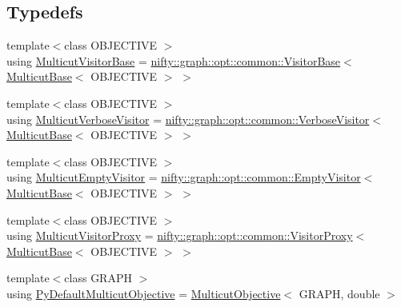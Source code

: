 \subsection*{Typedefs}
\begin{DoxyCompactItemize}
\item 
{\footnotesize template$<$class O\+B\+J\+E\+C\+T\+I\+VE $>$ }\\using \hyperlink{namespacenifty_1_1graph_1_1opt_1_1multicut_a3a8f68d7814a77531781fb55327f05d2}{Multicut\+Visitor\+Base} = \hyperlink{classnifty_1_1graph_1_1opt_1_1common_1_1VisitorBase}{nifty\+::graph\+::opt\+::common\+::\+Visitor\+Base}$<$ \hyperlink{classnifty_1_1graph_1_1opt_1_1multicut_1_1MulticutBase}{Multicut\+Base}$<$ O\+B\+J\+E\+C\+T\+I\+VE $>$ $>$
\item 
{\footnotesize template$<$class O\+B\+J\+E\+C\+T\+I\+VE $>$ }\\using \hyperlink{namespacenifty_1_1graph_1_1opt_1_1multicut_af26230604a77c9e38690db74e4fcb7b3}{Multicut\+Verbose\+Visitor} = \hyperlink{classnifty_1_1graph_1_1opt_1_1common_1_1VerboseVisitor}{nifty\+::graph\+::opt\+::common\+::\+Verbose\+Visitor}$<$ \hyperlink{classnifty_1_1graph_1_1opt_1_1multicut_1_1MulticutBase}{Multicut\+Base}$<$ O\+B\+J\+E\+C\+T\+I\+VE $>$ $>$
\item 
{\footnotesize template$<$class O\+B\+J\+E\+C\+T\+I\+VE $>$ }\\using \hyperlink{namespacenifty_1_1graph_1_1opt_1_1multicut_aa5367b6f47794a63333b96b04502396c}{Multicut\+Empty\+Visitor} = \hyperlink{classnifty_1_1graph_1_1opt_1_1common_1_1EmptyVisitor}{nifty\+::graph\+::opt\+::common\+::\+Empty\+Visitor}$<$ \hyperlink{classnifty_1_1graph_1_1opt_1_1multicut_1_1MulticutBase}{Multicut\+Base}$<$ O\+B\+J\+E\+C\+T\+I\+VE $>$ $>$
\item 
{\footnotesize template$<$class O\+B\+J\+E\+C\+T\+I\+VE $>$ }\\using \hyperlink{namespacenifty_1_1graph_1_1opt_1_1multicut_aa3ab4d745c71c8cd9ea1535b73f6e54b}{Multicut\+Visitor\+Proxy} = \hyperlink{classnifty_1_1graph_1_1opt_1_1common_1_1VisitorProxy}{nifty\+::graph\+::opt\+::common\+::\+Visitor\+Proxy}$<$ \hyperlink{classnifty_1_1graph_1_1opt_1_1multicut_1_1MulticutBase}{Multicut\+Base}$<$ O\+B\+J\+E\+C\+T\+I\+VE $>$ $>$
\item 
{\footnotesize template$<$class G\+R\+A\+PH $>$ }\\using \hyperlink{namespacenifty_1_1graph_1_1opt_1_1multicut_a7dbb5a757325e1a3bdf7e8ed21168986}{Py\+Default\+Multicut\+Objective} = \hyperlink{classnifty_1_1graph_1_1opt_1_1multicut_1_1MulticutObjective}{Multicut\+Objective}$<$ G\+R\+A\+PH, double $>$
\end{DoxyCompactItemize}
